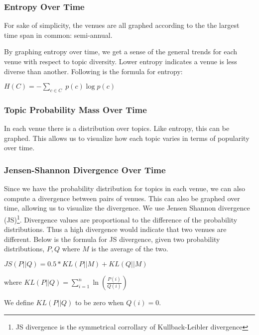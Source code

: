\subsubsection{Entropy Over Time}
For sake of simplicity, the venues are all graphed according to the the largest time span in common: semi-annual.

By graphing entropy over time, we get a sense of the general trends for each venue with respect to topic diversity. Lower entropy indicates a venue is less diverse than another. Following is the formula for entropy:

\begin{center}
$H(C) = - \sum_{c \in C} \;  p(c) \log p(c)$
\end{center}

\subsubsection{Topic Probability Mass Over Time}
In each venue there is a distribution over topics. Like entropy, this can be graphed. This allows us to visualize how each topic varies in terms of popularity over time.

\subsubsection{Jensen-Shannon Divergence Over Time}
Since we have the probability distribution for topics in each venue, we can also compute a divergence between pairs of venues. This can also be graphed over time, allowing us to visualize the divergence. We use Jensen Shannon divergence (JS)\footnote{JS divergence is the symmetrical corrollary of Kullback-Leibler divergence}. Divergence values are proportional to the difference of the probability distributions. Thus a high divergence would indicate that two venues are different. Below is the formula for JS divergence, given two probability distributions, $P, Q$ where $M$ is the average of the two.

\begin{center}
$JS(P||Q) = 0.5 * KL(P||M) + KL(Q||M)$

where $KL(P||Q) = \sum\limits_{i=1}^n \ln(\frac{P(i)}{Q(i)})$
\end{center}
We define $KL(P||Q)$ to be zero when $Q(i)=0$.



